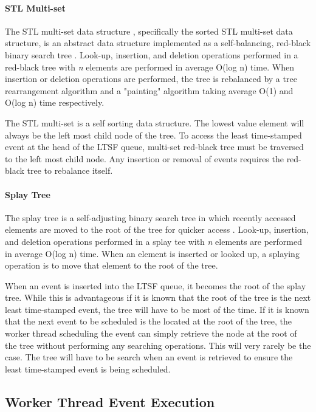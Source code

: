 \documentclass[11pt]{book}
\begin{document}
\paragraph{STL Multi-set}

The STL multi-set data structure , specifically the sorted STL multi-set data
structure, is an abstract data structure implemented as a self-balancing,
red-black binary search tree \cite{redblack}.  Look-up, insertion, and
deletion operations performed in a red-black tree with \emph{n} elements are
performed in average O(log n) time.  When insertion or deletion operations are
performed, the tree is rebalanced by a tree rearrangement algorithm and a
"painting" algorithm taking average O(1) and O(log n) time respectively. 

The STL multi-set is a self sorting data structure.  The lowest value element
will always be the left most child node of the tree.  To access the least
time-stamped event at the head of the LTSF queue, multi-set red-black tree must
be traversed to the left most child node.  Any insertion or removal of events
requires the red-black tree to rebalance itself.  

\paragraph{Splay Tree}

The splay tree is a self-adjusting binary search tree in which recently accessed
elements are moved to the root of the tree for quicker access \cite{splaytree}.
Look-up, insertion, and deletion operations performed in a splay tee with
\emph{n} elements are performed in average O(log n) time.  When an element is
inserted or looked up, a splaying operation is to move that element to the root
of the tree.

When an event is inserted into the LTSF queue, it becomes the root of the splay
tree.  While this is advantageous if it is known that the root of the tree is
the next least time-stamped event, the tree will have to be most of the time.
If it is known that the next event to be scheduled is the located at the root of
the tree, the worker thread scheduling the event can simply retrieve the node at
the root of the tree without performing any searching operations.  This will
very rarely be the case.  The tree will have to be search when an event is
retrieved to ensure the least time-stamped event is being scheduled.   

\subsection{Worker Thread Event Execution}
\end{document}
